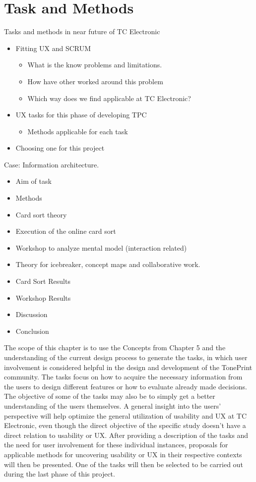 \chapter{Task and Methods}
\label{TaskAndMethods}

Tasks and methods in near future of TC Electronic
\begin{itemize}
	\item Fitting UX and SCRUM
		\begin{itemize}
			\item What is the know problems and limitations.
			\item How have other worked around this problem
			\item Which way does we find applicable at TC Electronic?
		\end{itemize}
	\item UX tasks for this phase of developing TPC
		\begin{itemize}
			\item Methods applicable for each task
		\end{itemize}
	\item Choosing one for this project
\end{itemize}

Case: Information architecture.
\begin{itemize}
	\item Aim of task
	\item Methods
	\item Card sort theory
	\item Execution of the online card sort
	\item Workshop to analyze mental model (interaction related)
	\item Theory for icebreaker, concept maps and collaborative work.
	\item Card Sort Results
	\item Workshop Results
	\item Discussion
	\item Conclusion
\end{itemize}



\noindent
The scope of this chapter is to use the Concepts from Chapter 5 and the understanding of the current design process to generate the tasks, in which user involvement is considered helpful in the design and development of the TonePrint community. The tasks focus on how to acquire the necessary information from the users to design different features or how to evaluate already made decisions. The objective of some of the tasks may also be to simply get a better understanding of the users themselves. A general insight into the users' perspective will help optimize the general utilization of usability and UX at TC Electronic, even though the direct objective of the specific study doesn't have a direct relation to usability or UX. After providing a description of the tasks and the need for user involvement for these individual instances, proposals for applicable methods for uncovering usability or UX in their respective contexts will then be presented. One of the tasks will then be selected to be carried out during the last phase of this project.

